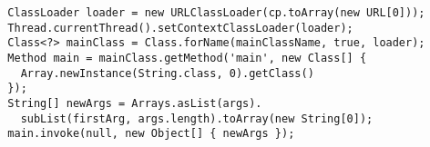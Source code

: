 \documentclass[
  article,
  a4paper,
  a4wide,
  smallheadings
]{book}
\begin{document}
\begin{lstlisting}
  ClassLoader loader = new URLClassLoader(cp.toArray(new URL[0]));
  Thread.currentThread().setContextClassLoader(loader);
  Class<?> mainClass = Class.forName(mainClassName, true, loader);
  Method main = mainClass.getMethod('main', new Class[] {
    Array.newInstance(String.class, 0).getClass()
  });
  String[] newArgs = Arrays.asList(args).
    subList(firstArg, args.length).toArray(new String[0]);
  main.invoke(null, new Object[] { newArgs });
\end{lstlisting}
\end{document}
